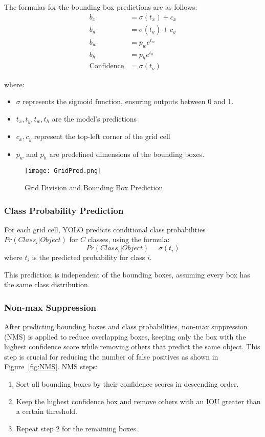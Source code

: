 \documentclass[12pt, letterpaper]{article}
\begin{document}
{\begin{spacing}{1.2}
The formulas for the bounding box predictions are as follows:
\begin{align*}
    b_x &= \sigma(t_x) + c_x \\
    b_y &= \sigma(t_y) + c_y \\
    b_w &= p_w e^{t_w} \\
    b_h &= p_h e^{t_h} \\
    \text{Confidence} &= \sigma(t_o)
\end{align*}

where:
\begin{itemize}
    \item $\sigma$ represents the sigmoid function, ensuring outputs between 0 and 1.
    \item $t_x, t_y, t_w, t_h$ are the model's predictions
    \item $c_x, c_y$ represent the top-left corner of the grid cell
    \item $p_w$ and $p_h$ are predefined dimensions of the bounding boxes.
\end{itemize}

\begin{figure}[htbp]
\centering
\texttt{[image: GridPred.png]}
\captionsetup{font=large}
\caption{Grid Division and Bounding Box Prediction}
\label{fig:GridPred}
\end{figure}


\subsubsection{Class Probability Prediction}

For each grid cell, YOLO predicts conditional class probabilities $Pr(Class_i | Object)$ for $C$ classes, using the formula:
\begin{equation*}
    Pr(Class_i | Object) = \sigma(t_{i})
\end{equation*}
where $t_{i}$ is the predicted probability for class $i$.

This prediction is independent of the bounding boxes, assuming every box has the same class distribution.


\subsubsection{Non-max Suppression}
After predicting bounding boxes and class probabilities, non-max suppression (NMS) is applied to reduce overlapping boxes, keeping only the box with the highest confidence score while removing others that predict the same object. This step is crucial for reducing the number of false positives as shown in Figure~\ref{fig:NMS}. NMS steps:
\begin{enumerate}
    \item Sort all bounding boxes by their confidence scores in descending order.
    \item Keep the highest confidence box and remove others with an IOU greater than a certain threshold.
    \item Repeat step 2 for the remaining boxes.
\end{enumerate}


\end{spacing}}
\end{document}
